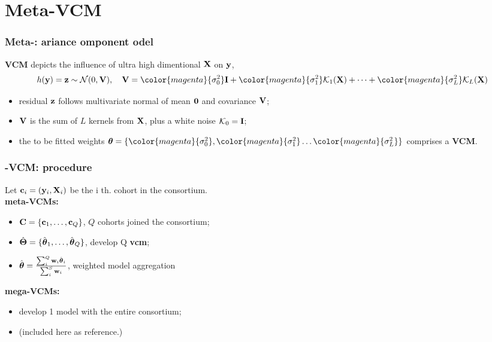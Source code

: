 \documentclass{beamer}
\begin{document}
\section{Meta-VCM}
\newcommand{\fit}[1]{{\color{magenta}{#1}}}
\newcommand{\blue}[1]{{\color{blue}{#1}}}
\begin{frame}
  \frametitle{Meta-\blue{\textbf{VCM}}: \blue{v}ariance \blue{c}omponent \blue{m}odel} %
  \textbf{VCM} depicts the influence of ultra high dimentional $\mathbf{X}$
  on $\mathbf{y}$,
  \begin{align}\label{eq:vcm}
    h(\vy) = \vz \sim \mathcal{N}(0, \xv), \quad
       \xv = \fit{\sigma^2_0} \id + \fit{\sigma^2_1} \mck_1(\xx) + \dots + \fit{\sigma^2_L} \mck_L(\xx)
  \end{align}
  \begin{itemize}
  \item residual $\mathbf{z}$ follows multivariate normal of mean
    $\boldsymbol{0}$ and covariance $\mathbf{V}$;
  \item $\mathbf{V}$ is the sum of $L$ kernels from $\mathbf{X}$, plus a white noise $\mathcal{K}_0 = \textbf{I}$;
  \item the to be fitted weights
    $\vtheta = \{\fit{\sigma^2_0}, \fit{\sigma^2_1} \dots
    \fit{\sigma^2_L}\}$ comprises a \textbf{VCM}.
  \end{itemize}
\end{frame}
\begin{frame}\frametitle{\blue{\textbf{Meta}}-VCM: procedure}
  Let $\mathbf{c}_i=(\mathbf{y}_i, \mathbf{X}_i)$ be the i th. cohort in the consortium. \\
  \textbf{{\color{red}meta}-VCMs:}
  \begin{itemize}
  \item $\mathbf{C} = \{\mathbf{c}_1, \dots, \mathbf{c}_Q \}$, $Q$ cohorts joined the
    consortium;
  \item $\hat{\boldsymbol{\Theta}}=\{\hat{\boldsymbol{\theta}}_1, \dots, \hat{\boldsymbol{\theta}}_Q\}$,
    develop Q \textbf{vcm};
  \item
    $\hat{\boldsymbol{\theta}} = \frac{\sum_i^Q \mathbf{w}_i \hat{\boldsymbol{\theta}}_i}{\sum_i^S
      \mathbf{w}_i}$, weighted model aggregation
  \end{itemize}
  \textbf{{\color{red}mega}-VCMs:}
  \begin{itemize}
  \item develop 1 model with the entire consortium;
  \item (included here as reference.)
  \end{itemize}
\end{frame}
\end{document}
